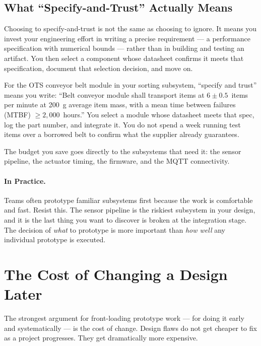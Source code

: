 \subsection{What ``Specify-and-Trust'' Actually Means}

Choosing to specify-and-trust is not the same as choosing to ignore.
It means you invest your engineering effort in writing a precise requirement
--- a performance specification with numerical bounds --- rather than in
building and testing an artifact.
You then select a component whose datasheet confirms it meets that
specification, document that selection decision, and move on.

For the OTS conveyor belt module in your sorting subsystem, ``specify and
trust'' means you write: ``Belt conveyor module shall transport items at
$6 \pm 0.5$~items per minute at 200~g average item mass, with a mean time
between failures (MTBF) $\geq 2{,}000$~hours.''
You select a module whose datasheet meets that spec, log the part number, and
integrate it.
You do not spend a week running test items over a borrowed belt to confirm what
the supplier already guarantees.

The budget you save goes directly to the subsystems that need it: the sensor
pipeline, the actuator timing, the firmware, and the MQTT connectivity.

\paragraph{In Practice.}
Teams often prototype familiar subsystems first because the work is
comfortable and fast.
Resist this.
The sensor pipeline is the riskiest subsystem in your design, and it is the
last thing you want to discover is broken at the integration stage.
The decision of \emph{what} to prototype is more important than \emph{how
well} any individual prototype is executed.


\section{The Cost of Changing a Design Later}
\label{sec:ch3-cost-of-change}

The strongest argument for front-loading prototype work --- for doing it early
and systematically --- is the cost of change.
Design flaws do not get cheaper to fix as a project progresses.
They get dramatically more expensive.

